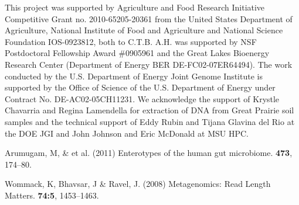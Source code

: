 \documentclass{pnastwo}
\begin{document}
\begin{article}
\begin{acknowledgments} This project was supported by Agriculture and Food
Research Initiative Competitive Grant no. 2010-65205-20361 from the United
States Department of Agriculture, National Institute of Food and Agriculture and
National Science Foundation IOS-0923812, both to C.T.B. A.H. was supported by
NSF Postdoctoral Fellowship Award \#0905961 and the Great Lakes Bioenergy
Research Center (Department of Energy BER DE-FC02-07ER64494). The work conducted
by the U.S. Department of Energy Joint Genome Institute is supported by the
Office of Science of the U.S. Department of Energy under Contract No.
DE-AC02-05CH11231. We acknowledge the support of Krystle Chavarria and Regina
Lamendella for extraction of DNA from Great Prairie soil samples and the
technical support of Eddy Rubin and Tijana Glavina del Rio at the DOE JGI and
John Johnson and Eric McDonald at MSU HPC. \end{acknowledgments}


\begin{thebibliography}{10}

 Arumugam, M, \& et al. \newblock (2011) Enterotypes of
the human gut microbiome.  {\bf 473}, 174--80.

 Wommack, K, Bhavsar, J \& Ravel, J. \newblock (2008) Metagenomics: Read Length Matters.  {\bf 74:5}, 1453--1463.





\end{thebibliography}
\end{article}
\end{document}
